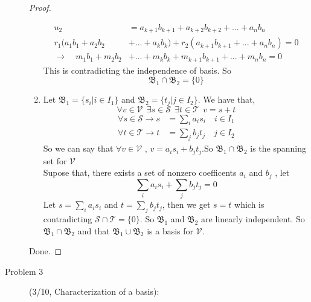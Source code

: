 \documentclass[a4paper]{article}
\begin{document}
\begin{description}
\begin{proof}
\begin{enumerate}
\begin{align*}
          u_{2}                           & =a_{k+1}b_{k+1}+a_{k+2}b_{k+2}+...+a_{n}b_{n}             \\
          r_{1}(a_{1}b_{1} +a_{2}b_{2}    & +... +a_{k}b_{k})+ r_{2}(a_{k+1}b_{k+1}+...+a_{n}b_{n})=0 \\
          \to\quad  m_{1}b_{1}+m_{2}b_{2} & +...+m_{k}b_{k}+m_{k+1}b_{k+1}+...+m_{n}b_{n}=0
         \end{align*}
         This is contradicting the independence of basis. So
         $$\text{$\mathfrak{B}_{1}\cap\mathfrak{B}_{2}=\{0\}$}$$
   \item Let $\mathfrak{B}_{1}=\{s_{i} | i \in I_{1}\}$
         and $\mathfrak{B}_{2}=\{t_{j} | j \in I_{2}\}$. We have that,
         $$\forall v \in \mathcal{V}\ \  \exists s \in \mathcal{S} \ \  \exists t \in \mathcal{T} \ \ v=s+t$$
         \begin{align*}
          \forall s \in \mathcal{S} \to s & =\sum_{i} a_{i}s_{i} \quad i \in I_{1} \\
          \forall t \in \mathcal{T} \to t & =\sum_{j} b_{j}t_{j} \quad j \in I_{2}
         \end{align*}
         So we can say that $\forall v \in \mathcal{V}$  , $v=a_{i}s_{i}+b_{j}t_{j}$.So
         $\mathfrak{B}_{1}\cap \mathfrak{B}_{2}$ is the spanning set for
         $\mathcal{V}$\\
         Supose that, there exists a set of nonzero coefficents $a_{i}$ and $b_{j}$ , let
         $$\sum_{i} a_{i}s_{i}+\sum_{j} b_{j}t_{j}=0$$
         Let $s=\sum_{i} a_{i}s_{i}$ and $t=\sum_{j} b_{j}t_{j}$, then we get $s=t$
         which is contradicting $\mathcal{S}\cap\mathcal{T}=\{0\}$. So $\mathfrak{B}_{1}$ and $\mathfrak{B}_{2}$ are linearly independent.
         So $\mathfrak{B}_{1}\cap\mathfrak{B}_{2}$ and that $\mathfrak{B}_{1}\cup\mathfrak{B}_{2}$ is a basis for $\mathcal{V}$.
  \end{enumerate}
  Done.
 \end{proof}
 \item[Problem 3](3/10, Characterization of a basis):{

}
\end{description}
\end{document}
